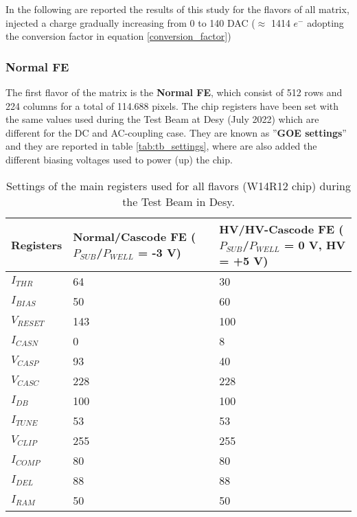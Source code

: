 In the following are reported the results of this study for the flavors of all matrix, injected a charge gradually increasing from 0 to 140 DAC ($\approx$ 1414 $e^{-}$ adopting the conversion factor in equation \ref{conversion_factor})



\subsubsection{Normal FE}


The first flavor of the matrix is the \textbf{Normal FE}, which consist of 512 rows and 224 columns for a total of 114.688 pixels. The chip registers have been set with the same values used during the Test Beam at Desy (July 2022) which are different for the DC and AC-coupling case. They are known as ''\textbf{GOE settings}'' and they are reported in table \vref{tab:tb_settings}, where are also added the different biasing voltages used to power (up) the chip.

\begin{table}[h!]
\centering
\begin{tabular}{>{} C{3.2cm}|C{3.7cm}|C{3.5cm}}
Registers & Normal/Cascode FE ($P_{SUB}$/$P_{WELL}$ = -3 V) & HV/HV-Cascode FE ($P_{SUB}$/$P_{WELL}$ = 0 V, HV = +5 V)\\[2ex]
\hline
$I_{THR}$ & 64 & 30\\[0.5ex]
\hline
$I_{BIAS}$ & 50 & 60\\
\hline
$V_{RESET}$ & 143 & 100\\
\hline
$I_{CASN}$ & 0 & 8\\
\hline
$V_{CASP}$ & 93 &40\\
\hline
$V_{CASC}$ & 228 & 228\\
\hline
$I_{DB}$ & 100 & 100\\
\hline
$I_{TUNE}$ & 53 & 53\\
\hline
$V_{CLIP}$ & 255 &255\\
\hline
$I_{COMP}$ & 80 & 80\\
\hline
$I_{DEL}$ & 88 & 88\\
\hline
$I_{RAM}$ & 50 & 50\\
\hline
\end{tabular}
\caption{Settings of the main registers used for all flavors (W14R12 chip) during the Test Beam in Desy.}
\label{tab:tb_settings}
\end{table}



